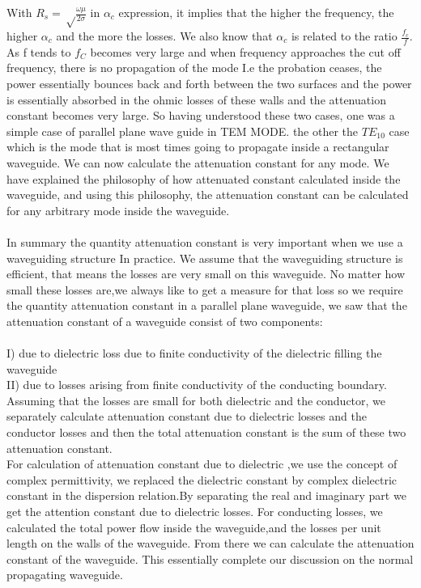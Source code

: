 With $R_s=\sqrt\frac{\omega\mu}{2\sigma}$ in $\alpha_{c}$ expression, it implies  that the higher the frequency, the higher $\alpha_{c}$ and the more the losses. We also know that $\alpha_{c}$  is related to the ratio $\frac{f_c}{f}$. As f tends to $f_C$ becomes very large and when frequency approaches the cut off frequency, there is no propagation of the mode I.e the probation ceases, the power essentially  bounces back and forth between  the two surfaces  and the power is essentially absorbed  in the ohmic losses  of these walls and the attenuation  constant  becomes very large. 
So having  understood these two cases, one was a simple case of parallel plane wave guide in TEM MODE. the other the $TE_{10}$ case which is the mode that is most times  going to propagate inside a rectangular waveguide. We can now calculate the attenuation  constant for any mode.   
We have explained   the philosophy of how attenuated constant calculated inside the waveguide, and using this philosophy, the attenuation  constant can be calculated for any arbitrary mode inside the waveguide.\\\\        
In summary  the quantity  attenuation  constant is very important  when we use a waveguiding structure In practice. We assume that the waveguiding structure is efficient, that means the losses are very small on this waveguide.
No matter how small these losses are,we always like to get a measure  for that loss so we require the quantity attenuation constant in a parallel  plane waveguide, we saw that the attenuation constant of a waveguide consist of two components:\\\\
I) due to dielectric  loss due to finite conductivity of the dielectric  filling the waveguide\\
II) due to losses arising from finite conductivity of the conducting boundary.
Assuming  that the losses are small for both dielectric  and the conductor, we separately calculate attenuation  constant due to dielectric losses and the conductor  losses and then the total attenuation  constant is the sum of these two attenuation constant.\\
For calculation of attenuation  constant due to dielectric ,we use the concept of complex permittivity, we replaced the dielectric  constant by complex dielectric  constant in the dispersion relation.By separating the real and imaginary part we get the attention  constant due to dielectric losses. 
For conducting losses, we calculated the total power flow inside the waveguide,and the losses per unit length on the walls of the waveguide. From there we can calculate the attenuation  constant  of  the  waveguide. This essentially complete our discussion on the normal propagating waveguide. 
